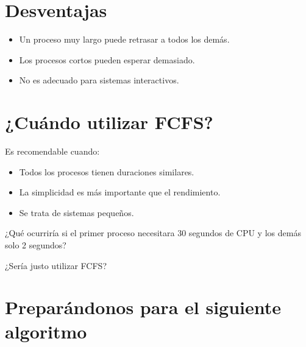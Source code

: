 \documentclass[
  spanish,
  letterpaper,
]{scrbook}
\providecommand{\tightlist}{%
  \setlength{\itemsep}{0pt}\setlength{\parskip}{0pt}}
\begin{document}

\chapter{Desventajas}\label{desventajas}

\begin{itemize}
\tightlist
\item
  Un proceso muy largo puede retrasar a todos los demás.
\item
  Los procesos cortos pueden esperar demasiado.
\item
  No es adecuado para sistemas interactivos.
\end{itemize}


\chapter{¿Cuándo utilizar FCFS?}\label{cuuxe1ndo-utilizar-fcfs}

Es recomendable cuando:

\begin{itemize}
\tightlist
\item
  Todos los procesos tienen duraciones similares.
\item
  La simplicidad es más importante que el rendimiento.
\item
  Se trata de sistemas pequeños.
\end{itemize}

\begin{tcolorbox}[enhanced jigsaw, arc=.35mm, bottomrule=.15mm, bottomtitle=1mm, breakable, colback=white, colbacktitle=quarto-callout-tip-color!10!white, colframe=quarto-callout-tip-color-frame, coltitle=black, left=2mm, leftrule=.75mm, opacityback=0, opacitybacktitle=0.6, rightrule=.15mm, title=\textcolor{quarto-callout-tip-color}{\faLightbulb}\hspace{0.5em}{Reflexiona}, titlerule=0mm, toprule=.15mm, toptitle=1mm]

¿Qué ocurriría si el primer proceso necesitara 30 segundos de CPU y los
demás solo 2 segundos?

¿Sería justo utilizar FCFS?

\end{tcolorbox}


\chapter{Preparándonos para el siguiente
algoritmo}\label{preparuxe1ndonos-para-el-siguiente-algoritmo}
\end{document}
